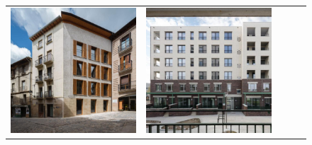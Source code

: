 \begin{figure}[H]
{\begin{tabular}{@{}ccccc@{}}
      \includegraphics[width=\linewidth]{Images/LoRAs/Geleding/Training_images/8.jpg} &
      \includegraphics[width=\linewidth]{Images/LoRAs/Geleding/Training_images/9.jpg} &

\end{tabular}}
\end{figure}

